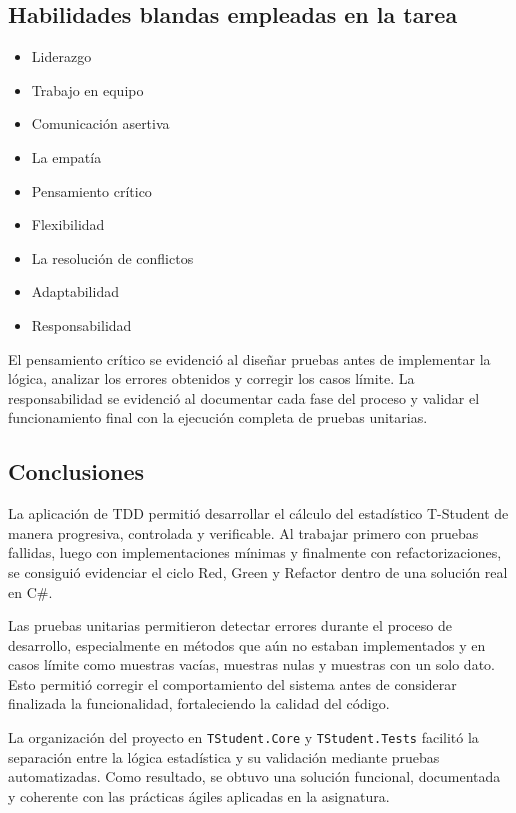 \documentclass[12pt]{article}
\begin{document}
\subsection{Habilidades blandas empleadas en la tarea}

\begin{itemize}
    \item[$\square$] Liderazgo
    \item[$\square$] Trabajo en equipo
    \item[$\square$] Comunicación asertiva
    \item[$\square$] La empatía
    \item[$\boxtimes$] Pensamiento crítico
    \item[$\square$] Flexibilidad
    \item[$\square$] La resolución de conflictos
    \item[$\square$] Adaptabilidad
    \item[$\boxtimes$] Responsabilidad
\end{itemize}

El pensamiento crítico se evidenció al diseñar pruebas antes de implementar la lógica, analizar los errores obtenidos y corregir los casos límite. La responsabilidad se evidenció al documentar cada fase del proceso y validar el funcionamiento final con la ejecución completa de pruebas unitarias.

\subsection{Conclusiones}

La aplicación de TDD permitió desarrollar el cálculo del estadístico T-Student de manera progresiva, controlada y verificable. Al trabajar primero con pruebas fallidas, luego con implementaciones mínimas y finalmente con refactorizaciones, se consiguió evidenciar el ciclo Red, Green y Refactor dentro de una solución real en C\#.

Las pruebas unitarias permitieron detectar errores durante el proceso de desarrollo, especialmente en métodos que aún no estaban implementados y en casos límite como muestras vacías, muestras nulas y muestras con un solo dato. Esto permitió corregir el comportamiento del sistema antes de considerar finalizada la funcionalidad, fortaleciendo la calidad del código.

La organización del proyecto en \texttt{TStudent.Core} y \texttt{TStudent.Tests} facilitó la separación entre la lógica estadística y su validación mediante pruebas automatizadas. Como resultado, se obtuvo una solución funcional, documentada y coherente con las prácticas ágiles aplicadas en la asignatura.
\end{document}
